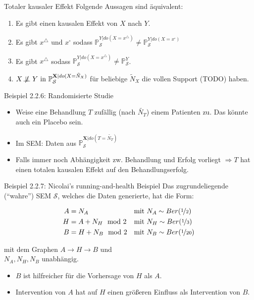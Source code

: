 \begin{frame}{Totaler kausaler Effekt}
    Folgende Aussagen sind äquivalent:

    \begin{enumerate}[label=(\roman*)]
        \item Es gibt einen kausalen Effekt von $X$ nach $Y$.
        \item Es gibt $x^\triangle$ und $x^\square$ sodass $\mathbb{P}_\mathcal{S}^{Y|do(X=x^\triangle)} \neq \mathbb{P}_\mathcal{S}^{Y|do(X=x^\square)}$
        \item Es gibt $x^\triangle$ sodass $\mathbb{P}_\mathcal{S}^{Y|do(X=x^\triangle)} \neq \mathbb{P}_\mathcal{S}^Y$.
        \item $X \not\!\perp\!\!\!\perp Y \text{ in } \mathbb{P}_\mathcal{S}^{\mathbf{X}|do(X=\tilde{N}_X)}$ für beliebige $\tilde{N}_X$ die vollen Support (TODO) haben.
    \end{enumerate}
\end{frame}

\begin{frame}{Beispiel 2.2.6: Randomisierte Studie}
    \begin{itemize}
        \item<1-> Weise eine Behandlung $T$ zufällig (nach $\tilde{N_T}$) einem
              Patienten zu. Das könnte auch ein Placebo sein.
        \item<2-> Im SEM: Daten aus $\mathbb{P}_\mathcal{S}^{\mathbf{X}|do(T=\tilde{N_T})}$
        \item<3-> Falls immer noch Abhängigkeit zw. Behandlung und Erfolg
              vorliegt $\Rightarrow T$ hat einen totalen kausalen Effekt auf
              den Behandlungserfolg.
    \end{itemize}
\end{frame}

\begin{frame}{Beispiel 2.2.7: Nicolai's running-and-health Beispiel}
    Das zugrundeliegende (\enquote{wahre}) SEM $\mathcal{S}$, welches die Daten
    generierte, hat die Form:

    \begin{align}
        A &= N_A            &&\text{mit } N_A \sim Ber(\nicefrac{1}{2})\\
        H &= A + N_H \mod 2 &&\text{mit } N_H \sim Ber(\nicefrac{1}{3})\\
        B &= H + N_B \mod 2 &&\text{mit } N_B \sim Ber(\nicefrac{1}{20})
    \end{align}

    mit dem Graphen $A \rightarrow H \rightarrow B$ und\\
    $N_A, N_H, N_B$ unabhängig.

    \begin{itemize}
        \item<1->  $B$ ist hilfreicher für die Vorhersage von $H$ als $A$.
        \item<2->  Intervention von $A$ hat auf $H$ einen größeren Einfluss als Intervention von $B$.
    \end{itemize}
\end{frame}

